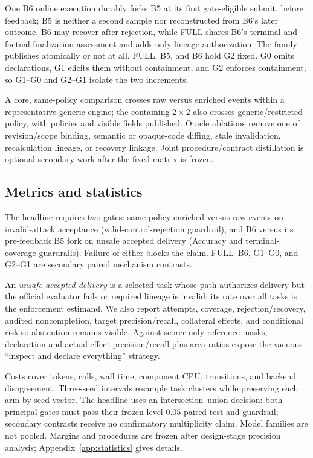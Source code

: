 One B6 online execution durably forks B5 at its first gate-eligible submit,
before feedback; B5 is neither a second sample nor reconstructed from B6's
later outcome. B6 may recover after rejection, while FULL shares B6's terminal
and factual finalization assessment and adds only lineage authorization. The
family publishes atomically or not at all. FULL, B5, and B6 hold G2 fixed. G0
omits declarations, G1 elicits them without containment, and G2 enforces
containment, so G1--G0 and G2--G1 isolate the two increments.

A core, same-policy comparison crosses raw versus enriched events within a
representative generic engine; the containing $2\times2$ also crosses
generic/restricted policy, with policies and visible fields published. Oracle
ablations remove one of revision/scope binding, semantic or opaque-code diffing,
stale invalidation, recalculation lineage, or recovery linkage. Joint
procedure/contract distillation is optional secondary work after the fixed matrix
is frozen.

\subsection{Metrics and statistics}

The headline requires two gates: same-policy enriched versus raw events on
invalid-attack acceptance (valid-control-rejection guardrail), and B6 versus its
pre-feedback B5 fork on unsafe accepted delivery (Accuracy and terminal-
coverage guardrails). Failure of either blocks the claim. FULL--B6, G1--G0, and
G2--G1 are secondary paired mechanism contrasts.

An \emph{unsafe accepted delivery} is a selected task whose path authorizes
delivery but the official evaluator fails or required lineage is invalid; its
rate over all tasks is the enforcement estimand. We also report attempts,
coverage, rejection/recovery, audited noncompletion, target precision/recall,
collateral effects, and conditional risk so abstention remains visible. Against
scorer-only reference masks, declaration and actual-effect precision/recall plus
area ratios expose the vacuous ``inspect and declare everything'' strategy.

Costs cover tokens, calls, wall time, component CPU, transitions, and backend
disagreement. Three-seed intervals resample task clusters while preserving each
arm-by-seed vector. The headline uses an intersection--union decision: both
principal gates must pass their frozen level-$0.05$ paired test and guardrail;
secondary contrasts receive no confirmatory multiplicity claim. Model families
are not pooled. Margins and procedures are frozen after design-stage precision
analysis; Appendix~\ref{app:statistics} gives details.

